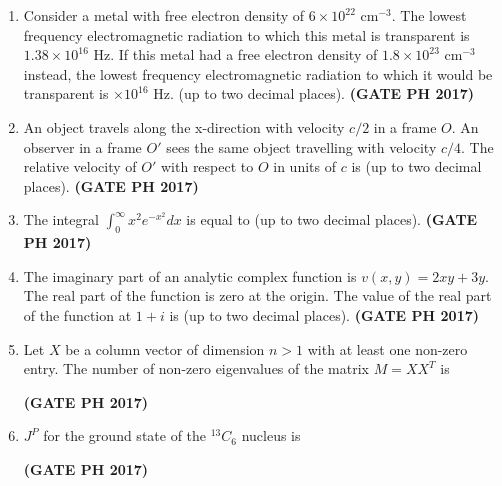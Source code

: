 \documentclass[14pt, a4paper]{extarticle}
\begin{document}
\begin{enumerate}[label=\textbf{Q.\arabic*}]
\item Consider a metal with free electron density of $6 \times 10^{22}$ cm$^{-3}$. The lowest frequency electromagnetic radiation to which this metal is transparent is $1.38 \times 10^{16}$ Hz. If this metal had a free electron density of $1.8 \times 10^{23}$ cm$^{-3}$ instead, the lowest frequency electromagnetic radiation to which it would be transparent is \underline{\hspace{3cm}} $\times 10^{16}$ Hz. (up to two decimal places).
\hfill \textbf{(GATE PH 2017)}

\item An object travels along the x-direction with velocity $c/2$ in a frame $O$. An observer in a frame $O'$ sees the same object travelling with velocity $c/4$. The relative velocity of $O'$ with respect to $O$ in units of $c$ is \underline{\hspace{3cm}} (up to two decimal places).
\hfill \textbf{(GATE PH 2017)}

\item The integral $\int_0^{\infty} x^2 e^{-x^2} dx$ is equal to \underline{\hspace{3cm}} (up to two decimal places).
\hfill \textbf{(GATE PH 2017)}

\item The imaginary part of an analytic complex function is $v(x,y) = 2xy+3y$. The real part of the function is zero at the origin. The value of the real part of the function at $1+i$ is \underline{\hspace{3cm}} (up to two decimal places).
\hfill \textbf{(GATE PH 2017)}

\item Let $X$ be a column vector of dimension $n>1$ with at least one non-zero entry. The number of non-zero eigenvalues of the matrix $M=XX^T$ is
\begin{enumerate}
\end{enumerate}
\hfill \textbf{(GATE PH 2017)}

\item $J^P$ for the ground state of the $^{13}C_6$ nucleus is
\begin{enumerate}
\end{enumerate}
\hfill \textbf{(GATE PH 2017)}


\end{enumerate}
\end{document}
